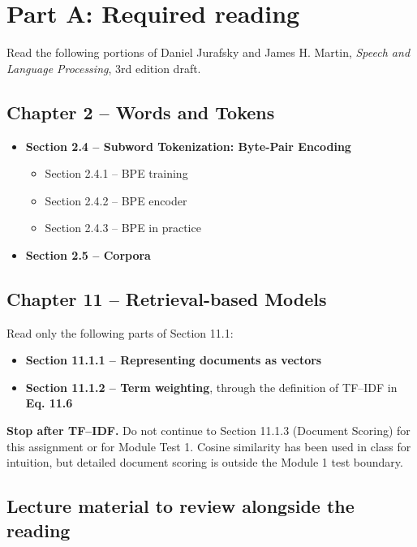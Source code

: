 \documentclass[11pt,a4paper]{article}
\begin{document}
\section{Part A: Required reading}

Read the following portions of Daniel Jurafsky and James H. Martin, \emph{Speech and Language Processing}, 3rd edition draft.

\subsection{Chapter 2 -- Words and Tokens}

\begin{itemize}
  \item \textbf{Section 2.4 -- Subword Tokenization: Byte-Pair Encoding}
    \begin{itemize}
      \item Section 2.4.1 -- BPE training
      \item Section 2.4.2 -- BPE encoder
      \item Section 2.4.3 -- BPE in practice
    \end{itemize}
  \item \textbf{Section 2.5 -- Corpora}
\end{itemize}

\subsection{Chapter 11 -- Retrieval-based Models}

Read only the following parts of Section 11.1:

\begin{itemize}
  \item \textbf{Section 11.1.1 -- Representing documents as vectors}
  \item \textbf{Section 11.1.2 -- Term weighting}, through the definition of TF--IDF in \textbf{Eq. 11.6}
\end{itemize}

\begin{noticebox}
\textbf{Stop after TF--IDF.} Do not continue to Section 11.1.3 (Document Scoring) for this assignment or for Module Test 1. Cosine similarity has been used in class for intuition, but detailed document scoring is outside the Module 1 test boundary.
\end{noticebox}

\subsection{Lecture material to review alongside the reading}
\end{document}
